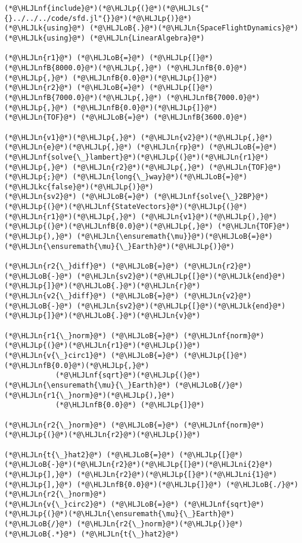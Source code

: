 \documentclass[12pt,a4paper]{article}
\newcommand{\HLJLk}[1]{\textcolor[RGB]{148,91,176}{\textbf{#1}}}
\newcommand{\HLJLkc}[1]{\textcolor[RGB]{59,151,46}{\textit{#1}}}
\newcommand{\HLJLn}[1]{#1}
\newcommand{\HLJLnf}[1]{\textcolor[RGB]{66,102,213}{#1}}
\newcommand{\HLJLs}[1]{\textcolor[RGB]{201,61,57}{#1}}
\newcommand{\HLJLnfB}[1]{\textcolor[RGB]{59,151,46}{#1}}
\newcommand{\HLJLni}[1]{\textcolor[RGB]{59,151,46}{#1}}
\newcommand{\HLJLoB}[1]{\textcolor[RGB]{102,102,102}{\textbf{#1}}}
\newcommand{\HLJLp}[1]{#1}
\begin{document}
\begin{lstlisting}
(*@\HLJLnf{include}@*)(*@\HLJLp{(}@*)(*@\HLJLs{"{}../../../code/sfd.jl"{}}@*)(*@\HLJLp{)}@*)
(*@\HLJLk{using}@*) (*@\HLJLoB{.}@*)(*@\HLJLn{SpaceFlightDynamics}@*)
(*@\HLJLk{using}@*) (*@\HLJLn{LinearAlgebra}@*)

(*@\HLJLn{r1}@*) (*@\HLJLoB{=}@*) (*@\HLJLp{[}@*)(*@\HLJLnfB{8000.0}@*)(*@\HLJLp{,}@*) (*@\HLJLnfB{0.0}@*)(*@\HLJLp{,}@*) (*@\HLJLnfB{0.0}@*)(*@\HLJLp{]}@*)
(*@\HLJLn{r2}@*) (*@\HLJLoB{=}@*) (*@\HLJLp{[}@*)(*@\HLJLnfB{7000.0}@*)(*@\HLJLp{,}@*) (*@\HLJLnfB{7000.0}@*)(*@\HLJLp{,}@*) (*@\HLJLnfB{0.0}@*)(*@\HLJLp{]}@*)
(*@\HLJLn{TOF}@*) (*@\HLJLoB{=}@*) (*@\HLJLnfB{3600.0}@*)

(*@\HLJLn{v1}@*)(*@\HLJLp{,}@*) (*@\HLJLn{v2}@*)(*@\HLJLp{,}@*) (*@\HLJLn{e}@*)(*@\HLJLp{,}@*) (*@\HLJLn{rp}@*) (*@\HLJLoB{=}@*) (*@\HLJLnf{solve{\_}lambert}@*)(*@\HLJLp{(}@*)(*@\HLJLn{r1}@*)(*@\HLJLp{,}@*) (*@\HLJLn{r2}@*)(*@\HLJLp{,}@*) (*@\HLJLn{TOF}@*)(*@\HLJLp{;}@*) (*@\HLJLn{long{\_}way}@*)(*@\HLJLoB{=}@*)(*@\HLJLkc{false}@*)(*@\HLJLp{)}@*)
(*@\HLJLn{sv2}@*) (*@\HLJLoB{=}@*) (*@\HLJLnf{solve{\_}2BP}@*)(*@\HLJLp{(}@*)(*@\HLJLnf{StateVectors}@*)(*@\HLJLp{(}@*)(*@\HLJLn{r1}@*)(*@\HLJLp{,}@*) (*@\HLJLn{v1}@*)(*@\HLJLp{),}@*) (*@\HLJLp{(}@*)(*@\HLJLnfB{0.0}@*)(*@\HLJLp{,}@*) (*@\HLJLn{TOF}@*)(*@\HLJLp{),}@*) (*@\HLJLn{\ensuremath{\mu}}@*)(*@\HLJLoB{=}@*)(*@\HLJLn{\ensuremath{\mu}{\_}Earth}@*)(*@\HLJLp{)}@*)

(*@\HLJLn{r2{\_}diff}@*) (*@\HLJLoB{=}@*) (*@\HLJLn{r2}@*) (*@\HLJLoB{-}@*) (*@\HLJLn{sv2}@*)(*@\HLJLp{[}@*)(*@\HLJLk{end}@*)(*@\HLJLp{]}@*)(*@\HLJLoB{.}@*)(*@\HLJLn{r}@*)
(*@\HLJLn{v2{\_}diff}@*) (*@\HLJLoB{=}@*) (*@\HLJLn{v2}@*) (*@\HLJLoB{-}@*) (*@\HLJLn{sv2}@*)(*@\HLJLp{[}@*)(*@\HLJLk{end}@*)(*@\HLJLp{]}@*)(*@\HLJLoB{.}@*)(*@\HLJLn{v}@*)

(*@\HLJLn{r1{\_}norm}@*) (*@\HLJLoB{=}@*) (*@\HLJLnf{norm}@*)(*@\HLJLp{(}@*)(*@\HLJLn{r1}@*)(*@\HLJLp{)}@*)
(*@\HLJLn{v{\_}circ1}@*) (*@\HLJLoB{=}@*) (*@\HLJLp{[}@*) (*@\HLJLnfB{0.0}@*)(*@\HLJLp{,}@*)
            (*@\HLJLnf{sqrt}@*)(*@\HLJLp{(}@*)(*@\HLJLn{\ensuremath{\mu}{\_}Earth}@*) (*@\HLJLoB{/}@*) (*@\HLJLn{r1{\_}norm}@*)(*@\HLJLp{),}@*)
            (*@\HLJLnfB{0.0}@*) (*@\HLJLp{]}@*)

(*@\HLJLn{r2{\_}norm}@*) (*@\HLJLoB{=}@*) (*@\HLJLnf{norm}@*)(*@\HLJLp{(}@*)(*@\HLJLn{r2}@*)(*@\HLJLp{)}@*)

(*@\HLJLn{t{\_}hat2}@*) (*@\HLJLoB{=}@*) (*@\HLJLp{[}@*)(*@\HLJLoB{-}@*)(*@\HLJLn{r2}@*)(*@\HLJLp{[}@*)(*@\HLJLni{2}@*)(*@\HLJLp{],}@*) (*@\HLJLn{r2}@*)(*@\HLJLp{[}@*)(*@\HLJLni{1}@*)(*@\HLJLp{],}@*) (*@\HLJLnfB{0.0}@*)(*@\HLJLp{]}@*) (*@\HLJLoB{./}@*) (*@\HLJLn{r2{\_}norm}@*)
(*@\HLJLn{v{\_}circ2}@*) (*@\HLJLoB{=}@*) (*@\HLJLnf{sqrt}@*)(*@\HLJLp{(}@*)(*@\HLJLn{\ensuremath{\mu}{\_}Earth}@*) (*@\HLJLoB{/}@*) (*@\HLJLn{r2{\_}norm}@*)(*@\HLJLp{)}@*) (*@\HLJLoB{.*}@*) (*@\HLJLn{t{\_}hat2}@*)


\end{lstlisting}
\end{document}
